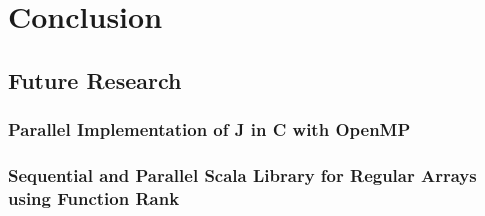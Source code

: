 %
%
\chapter{Conclusion}
\label{conc}

\section{Future Research}
\subsection{Parallel Implementation of J in C with OpenMP}

\subsection{Sequential and Parallel Scala Library for Regular Arrays using Function Rank}
